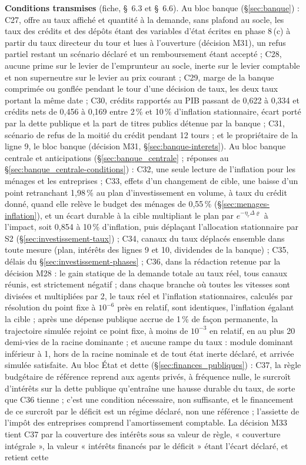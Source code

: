 \documentclass[11pt,a4paper]{article}
\begin{document}
\begin{proposee}
\textbf{Conditions transmises} (fiche, \S~6.3 et \S~6.6). Au bloc banque (\S\ref{sec:banque}) : C27, offre au taux affiché et quantité à la demande, sans plafond au socle, les taux des crédits et des dépôts étant des variables d'état écrites en phase 8\,(c) à partir du taux directeur du tour et lues à l'ouverture (décision M31), un refus partiel restant un scénario déclaré et un remboursement étant accepté ; C28, aucune prime sur le levier de l'emprunteur au socle, inerte sur le levier comptable et non superneutre sur le levier au prix courant ; C29, marge de la banque comprimée ou gonflée pendant le tour d'une décision de taux, les deux taux portant la même date ; C30, crédits rapportés au PIB passant de 0,622 à 0,334 et crédits nets de 0,456 à 0,169 entre 2\,\% et 10\,\% d'inflation stationnaire, écart porté par la dette publique et la part de titres publics détenue par la banque ; C31, scénario de refus de la moitié du crédit pendant 12 tours ; et le propriétaire de la ligne 9, le bloc banque (décision M31, \S\ref{sec:banque-interets}). Au bloc banque centrale et anticipations (\S\ref{sec:banque_centrale} ; réponses au \S\ref{sec:banque_centrale-conditions}) : C32, une seule lecture de l'inflation pour les ménages et les entreprises ; C33, effets d'un changement de cible, une baisse d'un point retranchant 1,98\,\% au plan d'investissement en volume, à taux du crédit donné, quand elle relève le budget des ménages de 0,55\,\% (\S\ref{sec:menages-inflation}), et un écart durable à la cible multipliant le plan par $e^{-\eta_r\Delta\varrho}$ à l'impact, soit 0,854 à 10\,\% d'inflation, puis déplaçant l'allocation stationnaire par S2 (\S\ref{sec:investissement-taux}) ; C34, canaux du taux déplacés ensemble dans toute mesure (plan, intérêts des lignes 9 et 10, dividendes de la banque) ; C35, délais du \S\ref{sec:investissement-phases} ; C36, dans la rédaction retenue par la décision M28 : le gain statique de la demande totale au taux réel, tous canaux réunis, est strictement négatif ; dans chaque branche où toutes les vitesses sont divisées et multipliées par 2, le taux réel et l'inflation stationnaires, calculés par résolution du point fixe à $10^{-6}$ près en relatif, sont identiques, l'inflation égalant la cible ; après une dépense publique accrue de 1\,\% de façon permanente, la trajectoire simulée rejoint ce point fixe, à moins de $10^{-3}$ en relatif, en au plus 20 demi-vies de la racine dominante ; et aucune rampe du taux : module dominant inférieur à 1, hors de la racine nominale et de tout état inerte déclaré, et arrivée simulée satisfaite. Au bloc État et dette (\S\ref{sec:finances_publiques}) : C37, la règle budgétaire de référence reprend aux agents privés, à fréquence nulle, le surcroît d'intérêts sur la dette publique qu'entraîne une hausse durable du taux, de sorte que C36 tienne ; c'est une condition nécessaire, non suffisante, et le financement de ce surcroît par le déficit est un régime déclaré, non une référence ; l'assiette de l'impôt des entreprises comprend l'amortissement comptable. La décision M33 tient C37 par la couverture des intérêts sous sa valeur de règle, « couverture intégrale », la valeur « intérêts financés par le déficit » étant l'écart déclaré, et retient cette 
\end{proposee}
\end{document}
